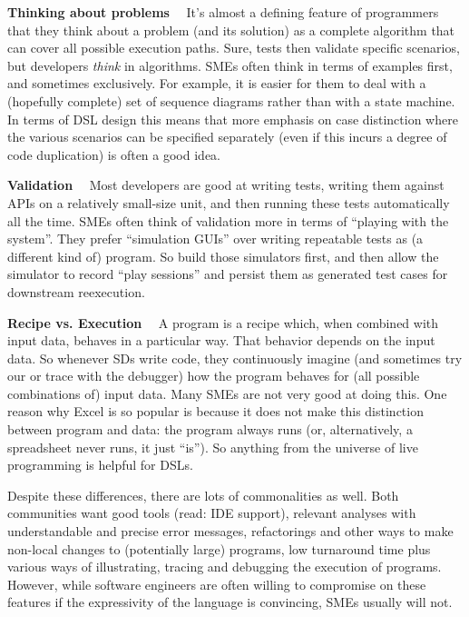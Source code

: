 \documentclass[runningheads]{llncs}
\newcommand\parhead[1]{\vspace{1mm}\noindent\textbf{{#1}}\ \ }
\begin{document}
\parhead{Thinking about problems} It's almost a defining feature of programmers
that they think about a problem (and its solution) as a complete algorithm that
can cover all possible execution paths. Sure, tests then validate specific
scenarios, but developers \emph{think} in algorithms. SMEs often think in terms
of examples first, and sometimes exclusively. For example, it is easier for them
to deal with a (hopefully complete) set of sequence diagrams rather than with a
state machine. In terms of DSL design this means that more emphasis on case
distinction where the various scenarios can be specified separately (even if
this incurs a degree of code duplication) is often a good idea. 

\parhead{Validation} Most developers are good at writing tests, writing
them against APIs on a relatively small-size unit, and then running these
tests automatically all the time. SMEs often think of validation more in
terms of ``playing with the system''. They prefer ``simulation GUIs'' over
writing repeatable tests as (a different kind of) program. So build those
simulators first, and then allow the simulator to record ``play sessions''
and persist them as generated test cases for downstream reexecution.

\parhead{Recipe vs. Execution} A program is a recipe which, when combined
with input data, behaves in a particular way. That behavior depends on the
input data. So whenever SDs write code, they continuously imagine (and sometimes
try our or trace with the debugger) how the program behaves for (all possible
combinations of) input data. Many SMEs are not very good at doing
this. One reason why Excel is so popular is because it does not make this
distinction between program and data: the program always runs (or, alternatively,
a spreadsheet never runs, it just ``is''). So anything from the universe of
live programming is helpful for DSLs.

\vspace{3mm}
\noindent Despite these differences, there are lots of commonalities as well.
Both communities want good tools (read: IDE support), relevant analyses with
understandable and precise error messages, refactorings and other ways to make
non-local changes to (potentially large) programs, low turnaround time plus
various ways of illustrating, tracing and debugging the execution of programs.  
However, while software engineers are often willing to compromise on these
features if the expressivity of the language is convincing, SMEs usually will 
not.
\end{document}
